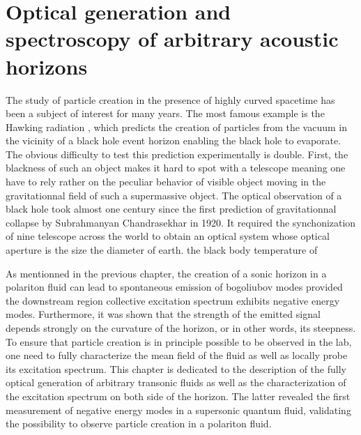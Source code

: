 

\newcommand{\kbf}{\pmb{k}}
\newcommand{\vbf}{\pmb{v}}
\newcommand{\rbf}{\pmb{r}}
\newcommand{\ombog}{\omega_{\mathrm{b}}}

\newcommand{\rmexp}{\mathrm{exp}}
\newcommand{\im}{\mathfrak{Im}}
\newcommand{\re}{\mathfrak{Re}}
\newcommand{\mbogo}{m_{\mathrm{det}}}
\newcommand{\cs}{c_{\mathrm{s}}}
\graphicspath{{./}{./fig/}{./chap3_custom_st/fig/}}

\chapter{Optical generation and spectroscopy of arbitrary acoustic horizons}

\label{chap:generation_transonic_fluid}

The study of particle creation in the presence of highly curved spacetime has been a subject of interest for many years. The most famous example is the Hawking radiation \cite{hawking_black_1972}, which predicts the creation of particles from the vacuum in the vicinity of a black hole event horizon enabling the black hole 
to evaporate. The obvious difficulty to test this prediction experimentally is double. First, the blackness of such an object makes it hard to spot with a telescope meaning one have to rely rather on the peculiar behavior of visible object moving in the gravitationnal field of such a supermassive object. The optical observation of a black hole took almost one century since the first prediction of gravitationnal collapse by Subrahmanyan Chandrasekhar in 1920. It required 
the synchonization of nine telescope across the world to obtain an optical system whose optical aperture is the size the diameter of earth. the black body temperature of 

As mentionned in the previous chapter, the creation of a sonic horizon in a polariton fluid can lead to spontaneous emission of bogoliubov modes provided the downstream region collective excitation spectrum
exhibits negative energy modes. Furthermore, it was shown that the strength of the emitted signal depends strongly on the curvature of the horizon, or in other words, its steepness. To ensure that particle creation is in principle 
possible to be observed in the lab, one need to fully characterize the mean field of the fluid as well as locally probe its excitation spectrum. This chapter is dedicated to the description of the fully optical generation of arbitrary transonic fluids as well as the characterization of the excitation spectrum on both side of the horizon. 
The latter revealed the first measurement of negative energy modes in a supersonic quantum fluid, validating the possibility to observe particle creation in a polariton fluid.

